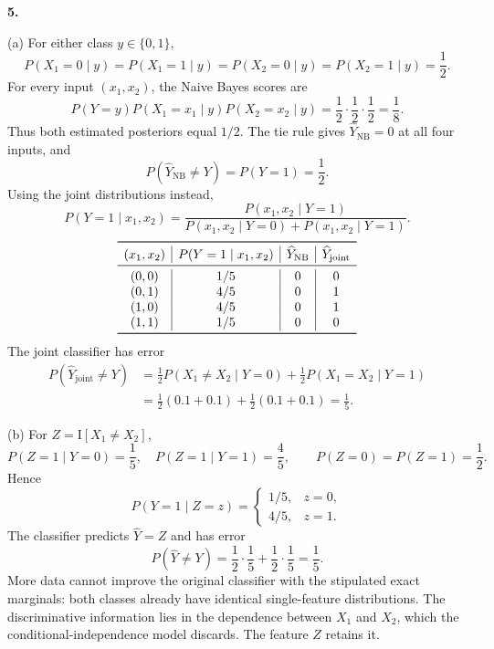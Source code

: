\documentclass[11pt,a4paper]{article}
\begin{document}
\newpage
\textbf{5.}

(a) For either class $y\in\{0,1\}$,
\[
P(X_1=0\mid y)=P(X_1=1\mid y)
=P(X_2=0\mid y)=P(X_2=1\mid y)=\frac12.
\]
For every input $(x_1,x_2)$, the Naive Bayes scores are
\[
P(Y=y)P(X_1=x_1\mid y)P(X_2=x_2\mid y)
=\frac12\cdot\frac12\cdot\frac12=\frac18.
\]
Thus both estimated posteriors equal $1/2$. The tie rule gives
$\widehat Y_{\mathrm{NB}}=0$ at all four inputs, and
\[
P(\widehat Y_{\mathrm{NB}}\ne Y)=P(Y=1)=\frac12.
\]
Using the joint distributions instead,
\[
P(Y=1\mid x_1,x_2)
=\frac{P(x_1,x_2\mid Y=1)}
{P(x_1,x_2\mid Y=0)+P(x_1,x_2\mid Y=1)}.
\]
\[
\begin{array}{c|c|c|c}
\toprule
(x_1,x_2)&P(Y=1\mid x_1,x_2)&\widehat Y_{\mathrm{NB}}&\widehat Y_{\mathrm{joint}}\\
\midrule
(0,0)&1/5&0&0\\
(0,1)&4/5&0&1\\
(1,0)&4/5&0&1\\
(1,1)&1/5&0&0\\
\bottomrule
\end{array}
\]
The joint classifier has error
\begin{align*}
P(\widehat Y_{\mathrm{joint}}\ne Y)
&=\frac12P(X_1\ne X_2\mid Y=0)
+\frac12P(X_1=X_2\mid Y=1)\\
&=\frac12(0.1+0.1)+\frac12(0.1+0.1)=\frac15.
\end{align*}

(b) For $Z=\mathrm{I}[X_1\ne X_2]$,
\[
P(Z=1\mid Y=0)=\frac15,\quad P(Z=1\mid Y=1)=\frac45,
\qquad P(Z=0)=P(Z=1)=\frac12.
\]
Hence
\[
P(Y=1\mid Z=z)=
\begin{cases}
1/5,&z=0,\\
4/5,&z=1.
\end{cases}
\]
The classifier predicts $\widehat Y=Z$ and has error
\[
P(\widehat Y\ne Y)=\frac12\cdot\frac15+\frac12\cdot\frac15=\frac15.
\]
More data cannot improve the original classifier with the stipulated exact
marginals: both classes already have identical single-feature distributions.
The discriminative information lies in the dependence between $X_1$ and $X_2$,
which the conditional-independence model discards. The feature $Z$ retains it.
\end{document}
